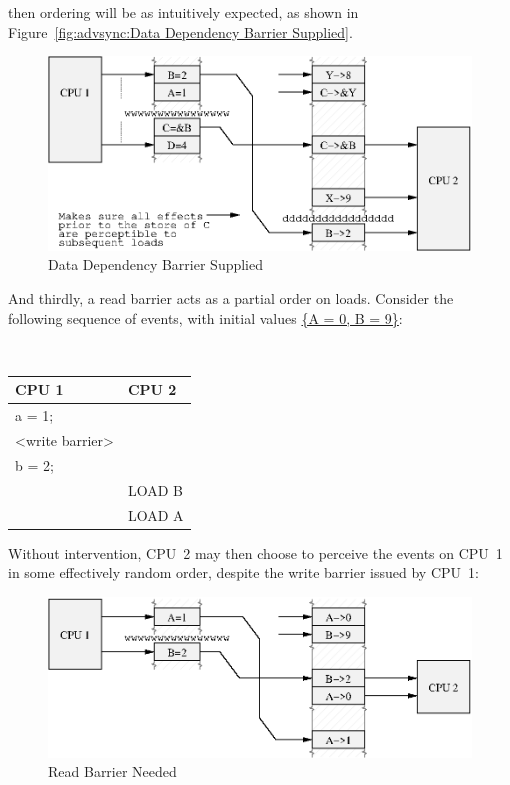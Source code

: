 then ordering will be as intuitively expected, as shown in
Figure~\ref{fig:advsync:Data Dependency Barrier Supplied}.

\begin{figure}[htb]
\begin{center}
\includegraphics{advsync/DataDependencySupplied}
\end{center}
\caption{Data Dependency Barrier Supplied}
\end{figure}

And thirdly, a read barrier acts as a partial order on loads.  Consider the
following sequence of events, with initial values
\url{{A = 0, B = 9}}:

\vspace{5pt}
\begin{minipage}[t]{\columnwidth}
\tt
\begin{tabular}{l|p{1.5in}}
	CPU 1 &		CPU 2 \\
	\hline
	a = 1; & \\
	<write barrier> & \\
	b = 2; & \\
		&	LOAD B \\
		&	LOAD A \\
\end{tabular}
\end{minipage}
\vspace{5pt}

Without intervention, CPU~2 may then choose to perceive the events on CPU~1 in
some effectively random order, despite the write barrier issued by CPU~1:

\begin{figure}[htb]
\begin{center}
\includegraphics{advsync/ReadBarrierNeeded}
\end{center}
\caption{Read Barrier Needed}
\end{figure}

